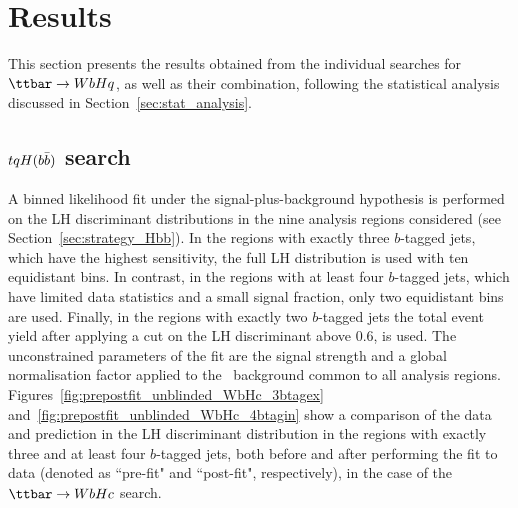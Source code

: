 \section{Results}
\label{sec:result}

This section presents the results obtained from the individual searches for $\Hq$, as well as their combination,
following the statistical analysis discussed in Section~\ref{sec:stat_analysis}.

\subsection{$tqH(b\bar{b})$ search}
\label{sec:results_Hbb}

A binned likelihood fit under the signal-plus-background hypothesis 
is performed on the LH discriminant distributions in the nine analysis regions considered (see Section~\ref{sec:strategy_Hbb}).
In the regions with exactly three $b$-tagged jets, which have the highest sensitivity, the full LH distribution is used with ten equidistant bins. 
In contrast, in the regions with at least four $b$-tagged jets,
which have limited data statistics and a small signal fraction, only two equidistant bins are used. Finally, in the regions with exactly two $b$-tagged jets 
the total event yield after applying a cut on the LH discriminant above 0.6, is used. 
The unconstrained parameters of the fit are the signal strength and a global normalisation factor applied to the \ttbin\ background 
common to all analysis regions.
Figures~\ref{fig:prepostfit_unblinded_WbHc_3btagex} and~\ref{fig:prepostfit_unblinded_WbHc_4btagin} show a comparison 
of the data and prediction in the LH discriminant distribution in the regions with exactly three and at least four $b$-tagged jets, 
both before and after performing the fit to data (denoted as ``pre-fit" and ``post-fit", respectively), in the case of the $\Hc$ search.  

